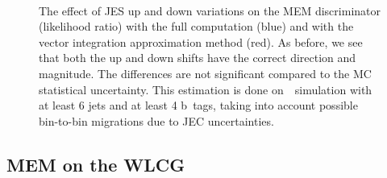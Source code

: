 \begin{figure}[ht]
\begin{centering}
\\
\caption[The full variation in the MEM discriminator]{The effect of JES up and down variations on the MEM discriminator (likelihood ratio) with the full computation (blue) and with the vector integration approximation method (red). As before, we see that both the up and down shifts have the correct direction and magnitude. The differences are not significant compared to the MC statistical uncertainty. This estimation is done on~\ttHbb~simulation with at least 6 jets and at least 4 b~tags, taking into account possible bin-to-bin migrations due to JEC uncertainties.}
\label{fig:jes_variation_ratio}
\end{centering}
\end{figure}

\subsection{MEM on the WLCG}

